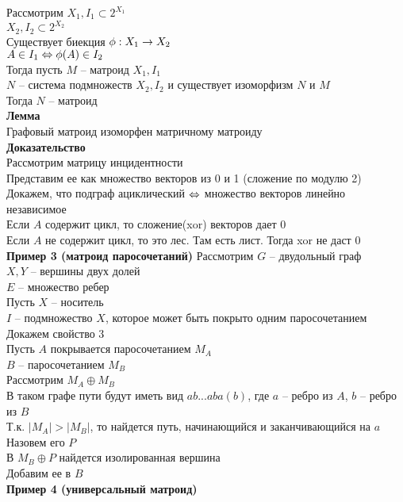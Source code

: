 \documentclass[12pt]{article}
\begin{document}
Рассмотрим $X_1, I_1 \subset 2^{X_1}$\\
$X_2, I_2 \subset 2^{X_2}$\\
Существует биекция $\phi:X_1 \rightarrow X_2$\\
$A \in I_1 \Leftrightarrow \phi(A) \in I_2$\\
Тогда пусть $M$ -- матроид $X_1, I_1$\\
$N$ -- система подмножеств $X_2, I_2$ и существует изоморфизм $N$ и $M$\\
Тогда $N$ -- матроид\\
\textbf{Лемма}\\
Графовый матроид изоморфен матричному матроиду\\
\textbf{Доказательство}\\
Рассмотрим матрицу инцидентности\\
Представим ее как множество векторов из 0 и 1 (сложение по модулю 2)\\
Докажем, что подграф ациклический $\Leftrightarrow$ множество векторов линейно независимое\\
Если $A$ содержит цикл, то сложение(xor) векторов дает 0\\
Если $A$ не содержит цикл, то это лес. Там есть лист. Тогда xor не даст 0\\
\textbf{Пример 3 (матроид паросочетаний)}
Рассмотрим $G$ -- двудольный граф \\
$X, Y$ -- вершины двух долей\\
$E$ -- множество ребер\\
Пусть $X$ -- носитель\\
$I$ -- подмножество $X$, которое может быть покрыто одним паросочетанием\\
Докажем свойство 3\\
Пусть $A$ покрывается паросочетанием $M_A$\\
$B$ -- паросочетанием $M_B$\\
Рассмотрим $M_A \oplus M_B$\\
В таком графе пути будут иметь вид $ab...aba(b)$, где $a$ -- ребро из $A$, $b$ -- ребро из $B$\\
Т.к. $|M_A| > |M_B|$, то найдется путь, начинающийся и заканчивающийся на $a$\\
Назовем его $P$\\
В $M_B \oplus P$ найдется изолированная вершина\\
Добавим ее в $B$\\
\textbf{Пример 4 (универсальный матроид)}\\
\end{document}
